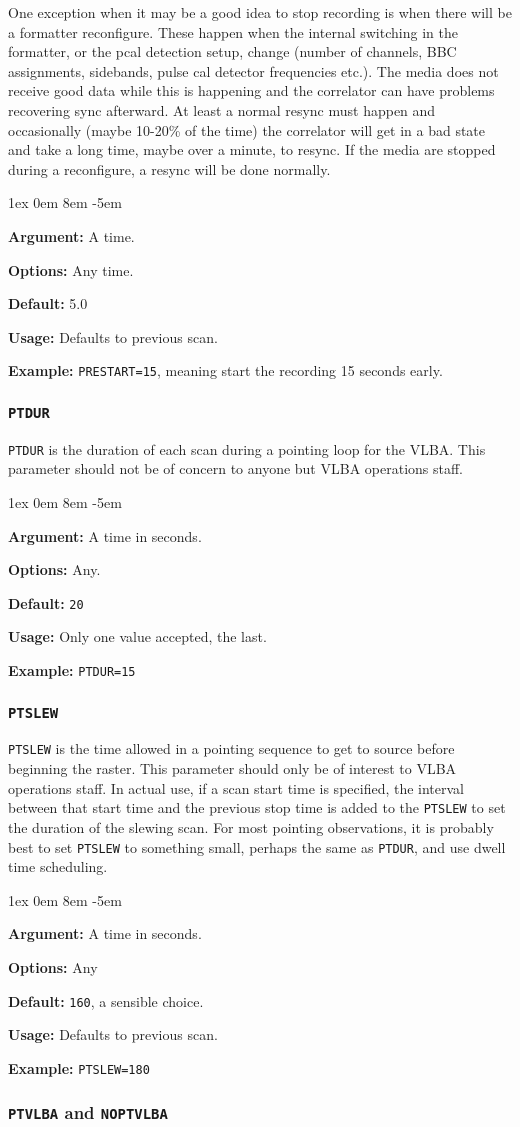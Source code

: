 \documentclass{report}
\newcommand{\rcwbox}[5]{
  \begin{list}{}{\parsep 1ex  \itemsep 0em
                 \leftmargin 8em  \itemindent -5em }
    \item {\bf Argument:} #1
    \item {\bf Options:}  #2
    \item {\bf Default:}  #3
    \item {\bf Usage:}    #4
    \item {\bf Example:}  #5
  \end{list}
}
\begin{document}
One exception when it may be a good idea to stop recording is when
there will be a formatter reconfigure.  These happen when the internal
switching in the formatter, or the pcal detection setup, change
(number of channels, BBC assignments, sidebands, pulse cal detector
frequencies etc.).  The media does not receive good data while this is
happening and the correlator can have problems recovering sync afterward.
At least a normal resync must happen and occasionally (maybe 10-20\%
of the time) the correlator will get in a bad state and take a long time,
maybe over a minute, to resync.  If the media are stopped during a
reconfigure, a resync will be done normally.

\rcwbox
{A time.}
{Any time.}
{5.0}
{Defaults to previous scan.}
{{\tt PRESTART=15}, meaning start the recording 15 seconds early.}

\subsubsection{\label{MP:PTDUR}{\tt PTDUR}}

{\tt PTDUR} is the duration of each scan during a pointing loop for
the VLBA. This parameter should not be of concern to anyone but VLBA
operations staff.

\rcwbox
{A time in seconds.}
{Any.}
{{\tt 20}}
{Only one value accepted, the last.}
{{\tt PTDUR=15}}


\subsubsection{\label{MP:PTSLEW}{\tt PTSLEW}}

{\tt PTSLEW} is the time allowed in a pointing sequence to get to
source before beginning the raster. This parameter should only be of
interest to VLBA operations staff. In actual use, if a scan start time
is specified, the interval between that start time and the previous
stop time is added to the {\tt PTSLEW} to set the duration of the
slewing scan.  For most pointing observations, it is probably best
to set {\tt PTSLEW} to something small, perhaps the same as {\tt PTDUR},
and use dwell time scheduling.

\rcwbox
{A time in seconds.}
{Any}
{{\tt 160}, a sensible choice.}
{Defaults to previous scan.}
{{\tt PTSLEW=180}}


\subsubsection{\label{MP:PTVLBA}{\tt PTVLBA} and {\tt NOPTVLBA}}
\end{document}
